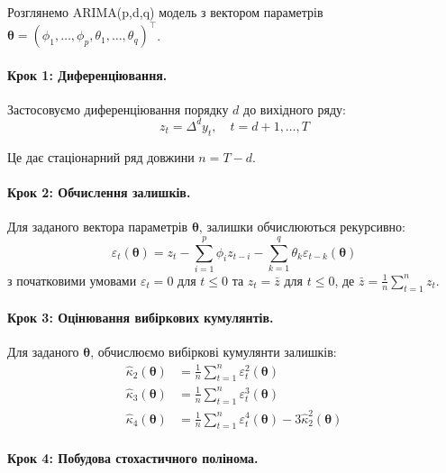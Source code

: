 \documentclass[12pt,a4paper]{article}
\begin{document}
Розглянемо ARIMA(p,d,q) модель з вектором параметрів $\boldsymbol{\theta} = (\phi_1, \ldots, \phi_p, \theta_1, \ldots, \theta_q)^\top$.

\paragraph{Крок 1: Диференціювання.}

Застосовуємо диференціювання порядку $d$ до вихідного ряду:
\begin{equation}
\label{eq:differenced_series}
z_t = \Delta^d y_t, \quad t = d+1, \ldots, T
\end{equation}

Це дає стаціонарний ряд довжини $n = T - d$.

\paragraph{Крок 2: Обчислення залишків.}

Для заданого вектора параметрів $\boldsymbol{\theta}$, залишки обчислюються рекурсивно:
\begin{equation}
\label{eq:residuals}
\varepsilon_t(\boldsymbol{\theta}) = z_t - \sum_{i=1}^{p} \phi_i z_{t-i} - \sum_{k=1}^{q} \theta_k \varepsilon_{t-k}(\boldsymbol{\theta})
\end{equation}
з початковими умовами $\varepsilon_t = 0$ для $t \leq 0$ та $z_t = \bar{z}$ для $t \leq 0$, де $\bar{z} = \frac{1}{n}\sum_{t=1}^{n} z_t$.

\paragraph{Крок 3: Оцінювання вибіркових кумулянтів.}

Для заданого $\boldsymbol{\theta}$, обчислюємо вибіркові кумулянти залишків:
\begin{align}
\hat{\kappa}_2(\boldsymbol{\theta}) &= \frac{1}{n} \sum_{t=1}^{n} \varepsilon_t^2(\boldsymbol{\theta}) \label{eq:sample_k2} \\
\hat{\kappa}_3(\boldsymbol{\theta}) &= \frac{1}{n} \sum_{t=1}^{n} \varepsilon_t^3(\boldsymbol{\theta}) \label{eq:sample_k3} \\
\hat{\kappa}_4(\boldsymbol{\theta}) &= \frac{1}{n} \sum_{t=1}^{n} \varepsilon_t^4(\boldsymbol{\theta}) - 3\hat{\kappa}_2^2(\boldsymbol{\theta}) \label{eq:sample_k4}
\end{align}

\paragraph{Крок 4: Побудова стохастичного полінома.}
\end{document}
